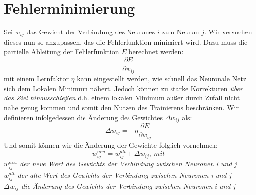 \documentclass{thesisclass}
\begin{document}
\section{Fehlerminimierung}
Sei $w_{ij}$ das Gewicht der Verbindung des Neurones $i$ zum Neuron $j$. Wir versuchen dieses nun so anzupassen, das die Fehlerfunktion minimiert wird. Dazu muss die partielle Ableitung der Fehlerfunktion $E$ berechnet werden:
\begin{equation}
\frac{\partial E}{\partial w_{ij}}
\end{equation}
mit einem Lernfaktor $\eta$ kann eingestellt werden, wie schnell das Neuronale Netz sich dem Lokalen Minimum nähert. Jedoch können zu starke Korrekturen \textit{\grqq{}über das Ziel hinausschießen\grqq{}} d.h. einem lokalen Minimum außer durch Zufall nicht nahe genug kommen und somit den Nutzen des Trainierens beschränken. Wir definieren infolgedessen die Änderung des Gewichtes $\Delta w_{ij}$ als:
\begin{equation}
\Delta w_{ij} = -\eta \frac{\partial E}{\partial w_{ij}}
\end{equation}
Und somit können wir die Änderung der Gewichte folglich vornehmen:
\begin{equation}
w_{ij}^{neu} = w_{ij}^{alt} + \Delta w_{ij},\ mit
\end{equation}
\textit{$w_{ij}^{neu}$ der neue Wert des Gewichts der Verbindung zwischen Neuronen i und j\\
$w_{ij}^{alt}$ der alte Wert des Gewichts	der Verbindung zwischen Neuronen i und j	\\
$\Delta w_{ij}$ die Änderung des Gewichts der Verbindung zwischen Neuronen i und j}
\end{document}
